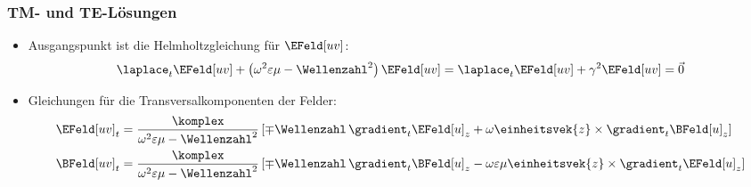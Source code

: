 \begin{frame}
  \frametitle{TM- und TE-Lösungen}
  \begin{itemize}[<+->]
  \item Ausgangspunkt ist die \alert{Helmholtzgleichung} für \(\EFeld[uv]\):
    \begin{equation*}
      \laplace_t \EFeld[uv] + \left(\omega^2\varepsilon\mu -\Wellenzahl^2 \right) \EFeld[uv] = \laplace_t \EFeld[uv] + \gamma^2 \EFeld[uv] =  \vec{0}
    \end{equation*}
  \item Gleichungen für die Transversalkomponenten der Felder:
       \begin{align*}
      \EFeld[uv]_t &= \frac{\komplex}{\omega^2\varepsilon\mu - \Wellenzahl^2} \left[ \mp \Wellenzahl\, \gradient_t \EFeld[u]_{z} + \omega  \einheitsvek{z}\times\gradient_t \BFeld[u]_{z}\right]\\
      \BFeld[uv]_t &= \frac{\komplex}{\omega^2\varepsilon\mu - \Wellenzahl^2} \left[ \mp \Wellenzahl\, \gradient_t \BFeld[u]_{z} - \omega\varepsilon\mu  \einheitsvek{z}\times\gradient_t \EFeld[u]_{z}\right]
    \end{align*}

  \end{itemize}
\end{frame}



